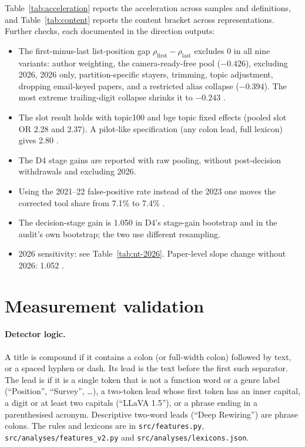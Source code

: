 Table~\ref{tab:acceleration} reports the \NAME{} acceleration across samples and definitions, and Table~\ref{tab:content} reports the content bracket across representations. Further checks, each documented in the direction outputs:
\begin{itemize}
\item The first-minus-last list-position gap $\rho_{\text{first}}-\rho_{\text{last}}$ excludes 0 in all nine variants: author weighting, the camera-ready-free pool ($-0.426$), excluding 2026, 2026 only, partition-specific stayers, trimming, topic adjustment, dropping email-keyed papers, and a restricted alias collapse ($-0.394$). The most extreme trailing-digit collapse shrinks it to $-0.243$ .
\item The slot result holds with topic100 and bge topic fixed effects (pooled slot OR 2.28 and 2.37). A pilot-like specification (any colon lead, full lexicon) gives 2.80 .
\item The D4 stage gains are reported with raw pooling, without post-decision withdrawals and excluding 2026.
\item Using the 2021--22 false-positive rate instead of the 2023 one moves the corrected tool share from 7.1\% to 7.4\% .
\item The \NAME{} decision-stage gain is 1.050  in D4's stage-gain bootstrap and  in the audit's own bootstrap; the two use different resampling.
\item 2026 sensitivity: see Table~\ref{tab:nt-2026}. Paper-level slope change without 2026: 1.052 .
\end{itemize}




\clearpage
\section{Measurement validation}
\label{app:nt-validation}

\paragraph{Detector logic.} A title is compound if it contains a colon (or full-width colon) followed by text, or a spaced hyphen or dash. Its lead is the text before the first such separator. The lead is \NAME{} if it is a single token that is not a function word or a genre label (``Position'', ``Survey'', \dots), a two-token lead whose first token has an inner capital, a digit or at least two capitals (``LLaVA 1.5''), or a phrase ending in a parenthesised acronym. Descriptive two-word leads (``Deep Rewiring'') are phrase colons. The rules and lexicons are in \texttt{src/features.py}, \texttt{src/analyses/features\_v2.py} and \texttt{src/analyses/lexicons.json}.

